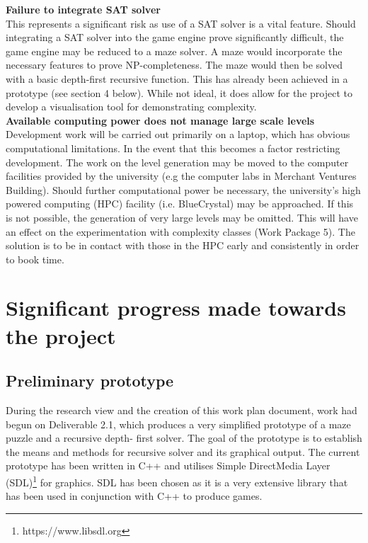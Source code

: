 \documentclass[a4paper]{article}
\begin{document}
\noindent \textbf{Failure to integrate SAT solver}\\

\noindent This represents a significant risk as use of a SAT solver is a vital feature. Should
integrating a SAT solver into the game engine prove significantly difficult, the game engine may be
reduced to a maze solver. A maze would incorporate the necessary features to prove NP-completeness.
The maze would then be solved with a basic depth-first recursive function. This has already been
achieved in a prototype (see section 4 below). While not ideal, it does allow for the project to
develop a visualisation tool for demonstrating complexity. \\

\noindent \textbf{Available computing power does not manage large scale levels} \\

\noindent Development work will be carried out primarily on a laptop, which has obvious
computational limitations. In the event that this becomes a factor restricting development. The work
on the level generation may be moved to the computer facilities provided by the university (e.g the
computer labs in Merchant Ventures Building). Should further computational power be necessary, the
university's high powered computing (HPC) facility (i.e. BlueCrystal) may be approached. If this is
not possible, the generation of very large levels may be omitted. This will have an effect on the
experimentation with complexity classes (Work Package 5). The solution is to be in contact with
those in the HPC early and consistently in order to book time.

\pagebreak

\section{Significant progress made towards the project}

\subsection{Preliminary prototype}

During the research view and the creation of this work plan document, work had begun on Deliverable
2.1, which produces a very simplified prototype of a maze puzzle and a recursive depth- first
solver. The goal of the prototype is to establish the means and methods for recursive solver and its
graphical output. The current prototype has been written in C++ and utilises Simple DirectMedia
Layer (SDL)\footnote{https://www.libsdl.org} for graphics. SDL has been chosen as it is a very
extensive library that has been used in conjunction with C++ to produce games.
\end{document}
